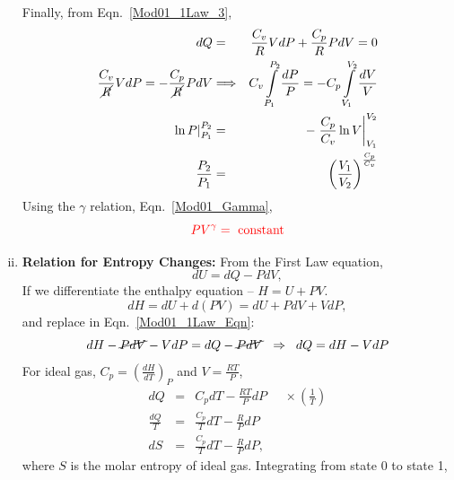 \documentclass[12pts,a4paper,amsmath,amssymb,floatfix]{article}%
\newcommand{\frc}{\displaystyle\frac}
\newcommand{\red}{\textcolor{red}}
\begin{document}
\begin{enumerate}[i)]
           Finally, from Eqn.~\ref{Mod01_1Law_3},
           \begin{eqnarray}
             dQ &=& \frc{C_{v}}{R}VdP + \frc{C_{p}}{R}PdV = 0 \nonumber \\
              \frc{C_{v}}{\cancel{R}}VdP = -\frc{C_{p}}{\cancel{R}}PdV &\Longrightarrow& C_{v}\int\limits_{P_{1}}^{P_{2}} \frc{dP}{P} = -C_{p}\int\limits_{V_{1}}^{V_{2}}\frc{dV}{V} \nonumber \\
              \left.\ln{P}\right|_{P_{1}}^{P_{2}} &=& -\left.\frc{C_{p}}{C_{v}}\ln{V}\right|_{V_{1}}^{V_{2}} \nonumber \\
              \frc{P_{2}}{P_{1}} &=& \left(\frc{V_{1}}{V_{2}}\right)^{\frac{C_{p}}{C_{v}}} \nonumber
           \end{eqnarray}
            Using the $\gamma$ relation, Eqn.~\ref{Mod01_Gamma},
           \begin{equation}
              \red{PV^{\gamma} = \text{ constant}}\label{Mod01_1Law_7}
           \end{equation}
%
      \item {\bf Relation for Entropy Changes:} From the First Law equation,
           \begin{equation}
              dU = dQ - PdV,\label{Mod01_1Law_Eqn}
           \end{equation} 
           If we differentiate the enthalpy equation -- $H = U + PV$.
                \begin{displaymath}
                    dH = dU + d(PV) = dU + PdV +VdP,
                \end{displaymath}
           and replace in Eqn.~\ref{Mod01_1Law_Eqn}:
                \begin{displaymath}
                    dH - \cancel{PdV} - VdP = dQ - \cancel{PdV} \;\;\Rightarrow \;\; dQ = dH - VdP
                \end{displaymath}
           For ideal gas, $C_{p}=\left(\frac{dH}{dT}\right)_{P}$ and $V=\frc{RT}{P}$,
                \begin{eqnarray}
                  dQ &=& C_{p}dT - \frc{RT}{P}dP\;\;\;\;\;\times\left(\frc{1}{T}\right) \nonumber \\
                  \frc{dQ}{T} &=& \frc{C_{p}}{T}dT - \frc{R}{P}dP \nonumber \\
                  dS &=& \frc{C_{p}}{T}dT - \frc{R}{P}dP, \nonumber
                \end{eqnarray}
           where $S$ is the molar entropy of ideal gas. Integrating from state 0 to state 1,
                \begin{eqnarray}

\end{eqnarray}
\end{enumerate}
\end{document}
